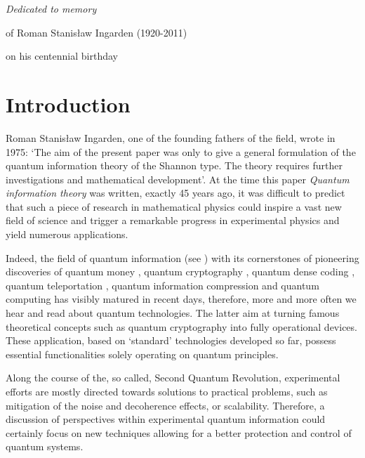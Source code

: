 \documentclass[english,aps,pra,nofootinbib,twocolumn,superscriptaddress]{revtex4-1}
\newcommand{\1}{{\rm 1\hspace{-0.9mm}l}}
\begin{document}
\maketitle


{\sl Dedicated to memory 

of Roman Stanis\l aw Ingarden (1920-2011)

 on his centennial birthday 
}



\section{Introduction}
Roman Stanis{\l}aw Ingarden, one of the founding fathers of the field, wrote in 1975:
`The aim of the present paper was only to give a general formulation
of the quantum information theory of the Shannon type.
 The theory requires further investigations and mathematical development'.
  At the time this paper  {\sl Quantum information theory}  \cite{In76} 
  was written, exactly 45 years ago, 
  it was difficult to predict that such a piece of research in mathematical physics could
  inspire a vast new field of science and trigger a remarkable progress in experimental physics
  and yield numerous applications. 
 
Indeed, the field of quantum information 
 (see \cite{BDV00,NC10}) with its cornerstones of  pioneering discoveries of quantum money \cite{Wiesner83}, quantum cryptography \cite{Bennett-Brassard84,Ekert91}, quantum dense coding \cite{Bennett-Wiesner92}, quantum teleportation \cite{Bennett-Tele93}, quantum information compression \cite{Schumacher95} and quantum computing \cite{Deutsch-Jozsa92,Shor94,Grover97} has visibly matured 
in recent days, therefore, more and more often we hear and read about quantum technologies.
The latter aim at turning famous theoretical concepts such as
quantum cryptography into fully operational devices.
  These application, based on `standard' technologies developed so far, 
  possess essential functionalities solely operating on quantum principles.  

Along the course of the, so called, Second Quantum Revolution, experimental efforts are mostly directed towards solutions to practical problems, such as mitigation of the noise and decoherence effects, or scalability. Therefore, a discussion of perspectives within experimental quantum information could certainly focus on new techniques allowing for a better protection and control of quantum systems. 
\end{document}
